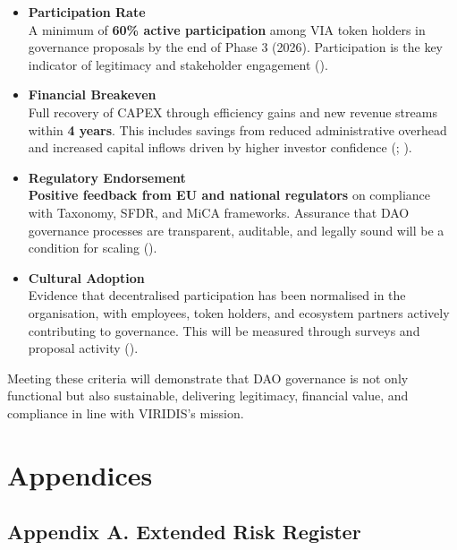 \documentclass[
  english,
  12pt,
  oneside,
  open=any]{scrbook}
\begin{document}
\begin{itemize}
\item
  \textbf{Participation Rate}\\
  A minimum of \textbf{60\% active participation} among VIA token
  holders in governance proposals by the end of Phase 3 (2026).
  Participation is the key indicator of legitimacy and stakeholder
  engagement ().
\item
  \textbf{Financial Breakeven}\\
  Full recovery of CAPEX through efficiency gains and new revenue
  streams within \textbf{4 years}. This includes savings from reduced
  administrative overhead and increased capital inflows driven by higher
  investor confidence
  (;
  ).
\item
  \textbf{Regulatory Endorsement}\\
  \textbf{Positive feedback from EU and national regulators} on
  compliance with Taxonomy, SFDR, and MiCA frameworks. Assurance that
  DAO governance processes are transparent, auditable, and legally sound
  will be a condition for scaling
  ().
\item
  \textbf{Cultural Adoption}\\
  Evidence that decentralised participation has been normalised in the
  organisation, with employees, token holders, and ecosystem partners
  actively contributing to governance. This will be measured through
  surveys and proposal activity
  ().
\end{itemize}

Meeting these criteria will demonstrate that DAO governance is not only
functional but also sustainable, delivering legitimacy, financial value,
and compliance in line with VIRIDIS's mission.

\chapter{Appendices}\label{sec-appendices}

\section{Appendix A. Extended Risk Register}\label{sec-risk-register}
\end{document}
